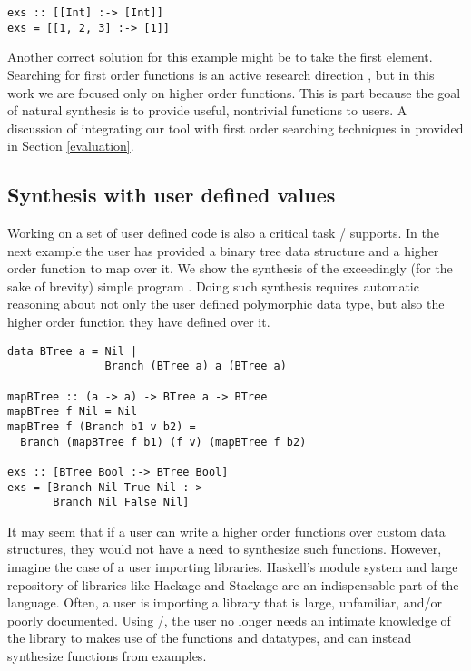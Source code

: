 \begin{lstlisting}
exs :: [[Int] :-> [Int]]
exs = [[1, 2, 3] :-> [1]]
\end{lstlisting}

Another correct solution for this example might be  to take the first element. Searching for first order functions is an active research direction \cite{DBLP:conf/aaip/Katayama09, flashFillPOPL}, but in this work we are focused only on higher order functions. This is part because the goal of natural synthesis is to provide useful, nontrivial functions to users. A discussion of integrating our tool with first order searching techniques in provided in Section \ref{evaluation}.

\subsection{Synthesis with user defined values}

Working on a set of user defined code is also a critical task \ourTool/ supports. In the next example the user has provided a binary tree data structure and a higher order function to map over it. We show the synthesis of the exceedingly (for the sake of brevity) simple program . Doing such synthesis requires automatic reasoning about not only the user defined polymorphic data type, but also the higher order function they have defined over it.

\begin{lstlisting}
data BTree a = Nil |
               Branch (BTree a) a (BTree a)

mapBTree :: (a -> a) -> BTree a -> BTree 
mapBTree f Nil = Nil
mapBTree f (Branch b1 v b2) = 
  Branch (mapBTree f b1) (f v) (mapBTree f b2)

exs :: [BTree Bool :-> BTree Bool]
exs = [Branch Nil True Nil :->
       Branch Nil False Nil]
\end{lstlisting}

It may seem that if a user can write a higher order functions over custom data structures, they would not have a need to synthesize such functions.
However, imagine the case of a user importing libraries.
Haskell's module system and large repository of libraries like Hackage and Stackage are an indispensable part of the language\cite{hackage,stackage}.
Often, a user is importing a library that is large, unfamiliar, and/or poorly documented.
Using \ourTool/, the user no longer needs an intimate knowledge of the library to makes use of the functions and datatypes, and can instead synthesize functions from examples.


